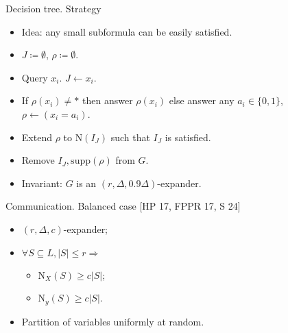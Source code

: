 \begin{frame}{Decision tree. Strategy}

    \begin{itemize}
        \item Idea: any small subformula can be easily satisfied.
    \end{itemize}

    \pause
    \vspace{0.5cm}

    \begin{itemize}
        \item $J \coloneqq \emptyset$, $\rho \coloneqq \emptyset$.
            \pause
        \item Query $x_i$. $J \gets x_i$.
            \pause
        \item If $\rho(x_i) \neq *$ then answer $\rho(x_i)$ else
            answer any $a_i \in \{0, 1\}$, $\rho \gets (x_i = a_i)$.
            \pause
        \item Extend $\rho$ to $\mathrm{N}(I_J)$ such that $I_J$ is
            satisfied.
        \item Remove $I_J, \mathrm{supp}(\rho)$ from $G$.
    \end{itemize}

    \pause
    \vspace{0.5cm}
    \begin{itemize}
        \item Invariant: $G$ is an $(r, \Delta, 0.9 \Delta)$-expander.
    \end{itemize}

\end{frame}


\begin{frame}{Communication. Balanced case [HP 17, FPPR 17, S 24]}
    \begin{minipage}{0.38\linewidth}
        \centering
        
    \end{minipage}
    \begin{minipage}{0.58\linewidth}
        \begin{itemize}
            \item $(r, \Delta, c)$-expander;
            \item $\forall S \subseteq L, |S| \le r \Rightarrow$
                \begin{itemize}
                    \item $\mathrm{N}_{X}(S) \ge c |S|$;
                    \item $\mathrm{N}_{y}(S) \ge c |S|$.
                \end{itemize}
        \end{itemize}
    \end{minipage}

    \pause
    \begin{itemize}
        \item Partition of variables uniformly at random.
    \end{itemize}
\end{frame}


